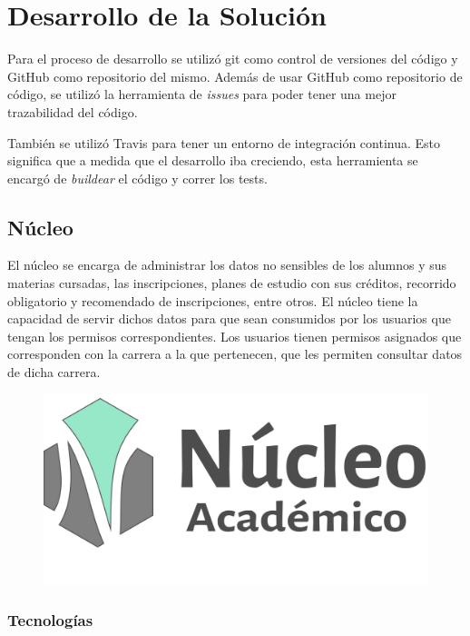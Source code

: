 \chapter{Desarrollo de la Solución}
\label{sec:desarrollo}

Para el proceso de desarrollo se utilizó git como control de versiones del código y GitHub como repositorio del mismo. Además de usar GitHub como repositorio de código, se utilizó la herramienta de \textit{issues} para poder tener una mejor trazabilidad del código.

También se utilizó Travis para tener un entorno de integración continua. Esto significa que a medida que el desarrollo iba creciendo, esta herramienta se encargó de \textit{buildear} el código y correr los tests.  

\section[Núcleo]{Núcleo}

El núcleo se encarga de administrar los datos no sensibles de los alumnos y sus materias cursadas, las inscripciones, planes de estudio con sus créditos, recorrido obligatorio y recomendado de inscripciones, entre otros.
El núcleo tiene la capacidad de servir dichos datos para que sean consumidos por los usuarios que tengan los permisos correspondientes.
Los usuarios tienen permisos asignados que corresponden con la carrera a la que pertenecen, que les permiten consultar datos de dicha carrera. 


\begin{figure}[h!]
  \centering
    \includegraphics[scale=0.5]{images/nucleo/nucleo-fondoblanco.png}
  \label{fig:django}
\end{figure}

\subsection{Tecnologías}

